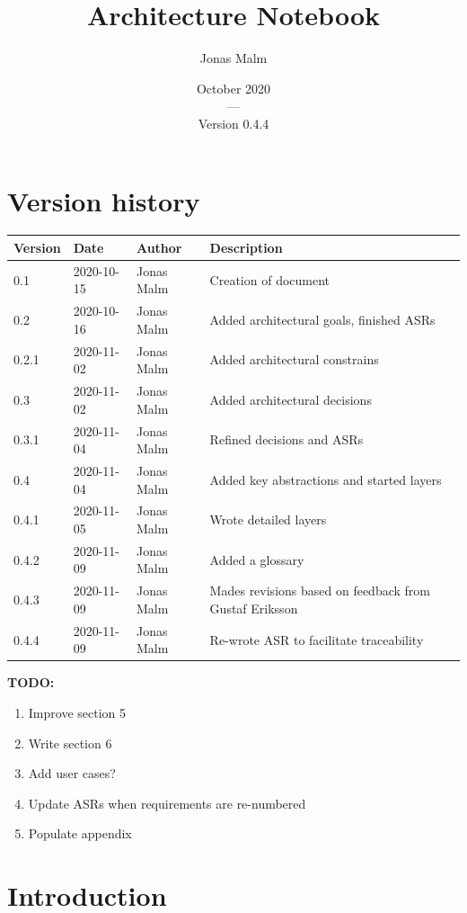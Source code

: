 \documentclass{article}
\title{Architecture Notebook}
\author{Jonas Malm}
\date{October 2020\\---\\Version 0.4.4}
\begin{document}
\maketitle
\clearpage

\begin{table}
\section*{Version history}
\centering
\begin{tabular}{|l|l|l|l|}
\hline
Version & Date & Author & Description \\ \hline
0.1 & 2020-10-15 & Jonas Malm & Creation of document\\ 
0.2 & 2020-10-16 & Jonas Malm & Added architectural goals, finished ASRs\\
0.2.1 & 2020-11-02 & Jonas Malm & Added architectural constrains\\ 
0.3 & 2020-11-02 & Jonas Malm & Added architectural decisions\\
0.3.1 & 2020-11-04 & Jonas Malm & Refined decisions and ASRs\\
0.4 & 2020-11-04 & Jonas Malm & Added key abstractions and started layers\\
0.4.1 & 2020-11-05 & Jonas Malm & Wrote detailed layers\\
0.4.2 & 2020-11-09 & Jonas Malm & Added a glossary\\
0.4.3 & 2020-11-09 & Jonas Malm & Mades revisions based on feedback from Gustaf Eriksson\\
0.4.4 & 2020-11-09 & Jonas Malm & Re-wrote ASR to facilitate traceability\\

\hline
\end{tabular}
\end{table}
\textbf{TODO:}
\begin{enumerate}[label=(\roman*)]
\item  Improve section 5
\item  Write section 6
\item Add user cases?
\item Update ASRs when requirements are re-numbered
\item Populate appendix
\end{enumerate}


\clearpage

\tableofcontents
\clearpage

\section{Introduction}
\end{document}
